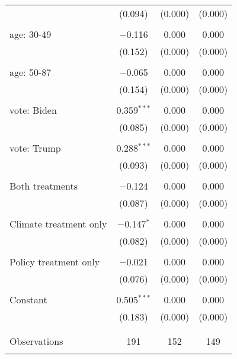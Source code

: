\begin{tabular}{@{\extracolsep{5pt}}lccc}
  & (0.094) & (0.000) & (0.000) \\ 
  & & & \\ 
 age: 30-49 & $-$0.116 & 0.000 & 0.000 \\ 
  & (0.152) & (0.000) & (0.000) \\ 
  & & & \\ 
 age: 50-87 & $-$0.065 & 0.000 & 0.000 \\ 
  & (0.154) & (0.000) & (0.000) \\ 
  & & & \\ 
 vote: Biden & 0.359$^{***}$ & 0.000 & 0.000 \\ 
  & (0.085) & (0.000) & (0.000) \\ 
  & & & \\ 
 vote: Trump & 0.288$^{***}$ & 0.000 & 0.000 \\ 
  & (0.093) & (0.000) & (0.000) \\ 
  & & & \\ 
 Both treatments & $-$0.124 & 0.000 & 0.000 \\ 
  & (0.087) & (0.000) & (0.000) \\ 
  & & & \\ 
 Climate treatment only & $-$0.147$^{*}$ & 0.000 & 0.000 \\ 
  & (0.082) & (0.000) & (0.000) \\ 
  & & & \\ 
 Policy treatment only & $-$0.021 & 0.000 & 0.000 \\ 
  & (0.076) & (0.000) & (0.000) \\ 
  & & & \\ 
 Constant & 0.505$^{***}$ & 0.000 & 0.000 \\ 
  & (0.183) & (0.000) & (0.000) \\ 
  & & & \\ 
\hline \\[-1.8ex] 

Observations & 191 & 152 & 149 \\ 
\hline 
\hline \\[-1.8ex] 
\end{tabular} 